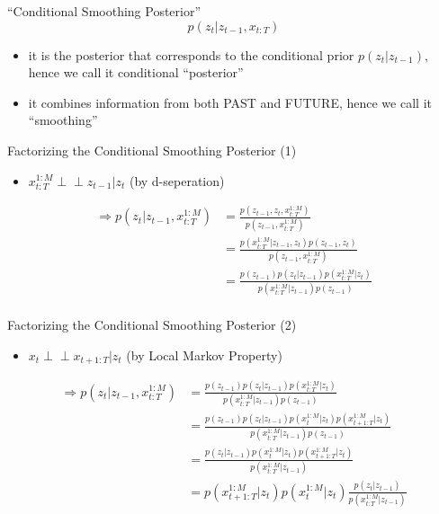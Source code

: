 \documentclass{beamer}
\begin{document}
\begin{frame}{``Conditional Smoothing Posterior''}
\[
p(z_t|z_{t-1},x_{t:T})
\]
\begin{itemize}
\item it is the posterior that corresponds to the
conditional prior $p(z_t|z_{t-1})$, hence we call it conditional ``posterior''
\item it combines information from both
PAST and FUTURE, hence we call it ``smoothing''
\end{itemize}
\end{frame}

\begin{frame}{Factorizing the Conditional Smoothing Posterior (1)}
\begin{itemize}
\item $x_{t:T}^{1:M}\perp\!\!\!\perp z_{t-1}|z_{t}$ (by d-seperation)
\end{itemize}
\[
\begin{split}
\Rightarrow p(z_t|z_{t-1},x_{t:T}^{1:M})&=\frac{p(z_{t-1},z_{t},x_{t:T}^{1:M})}{p(z_{t-1},x_{t:T}^{1:M})}\\
&=\frac{p(x_{t:T}^{1:M}|z_{t-1},z_{t})p(z_{t-1},z_{t})}{p(z_{t-1},x_{t:T}^{1:M})}\\
&=\frac{p(z_{t-1})p(z_t|z_{t-1})p(x_{t:T}^{1:M}|z_t)}{p(x_{t:T}^{1:M}|z_{t-1})p(z_{t-1})}\\
\end{split}
\]
\end{frame}

\begin{frame}{Factorizing the Conditional Smoothing Posterior (2)}
\begin{itemize}
\item $x_t\perp\!\!\!\perp x_{t+1:T}|z_t$ (by Local Markov Property)
\end{itemize}
\[
\begin{split}
\Rightarrow p(z_t|z_{t-1},x_{t:T}^{1:M})&=\frac{p(z_{t-1})p(z_t|z_{t-1})p(x_{t:T}^{1:M}|z_t)}{p(x_{t:T}^{1:M}|z_{t-1})p(z_{t-1})}\\
&=\frac{p(z_{t-1})p(z_t|z_{t-1})p(x_t^{1:M}|z_t)p(x_{t+1:T}^{1:M}|z_t)}{p(x_{t:T}^{1:M}|z_{t-1})p(z_{t-1})}\\
&=\frac{p(z_t|z_{t-1})p(x_t^{1:M}|z_t)p(x_{t+1:T}^{1:M}|z_t)}{p(x_{t:T}^{1:M}|z_{t-1})}\\
&=p(x_{t+1:T}^{1:M}|z_t)p(x_t^{1:M}|z_t)\frac{p(z_t|z_{t-1})}{p(x_{t:T}^{1:M}|z_{t-1})}
\end{split}
\]
\end{frame}
\end{document}
